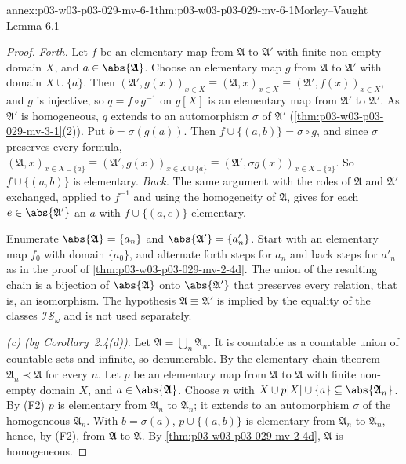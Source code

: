 \begin{annexitem}{annex:p03-w03-p03-029-mv-6-1}{thm:p03-w03-p03-029-mv-6-1}{Morley--Vaught Lemma 6.1}
\begin{proof}
\emph{Forth.} Let \(f\) be an elementary map from \(\mathfrak A\) to
\(\mathfrak A'\) with finite non-empty domain \(X\), and
\(a\in\abs{\mathfrak A}\). Choose an elementary map \(g\) from
\(\mathfrak A\) to \(\mathfrak A'\) with domain \(X\cup\{a\}\). Then
\((\mathfrak A',g(x))_{x\in X}\equiv(\mathfrak A,x)_{x\in X}\equiv(\mathfrak
A',f(x))_{x\in X}\), and \(g\) is injective, so \(q=f\circ g^{-1}\) on
\(g[X]\) is an elementary map from \(\mathfrak A'\) to \(\mathfrak A'\). As
\(\mathfrak A'\) is homogeneous, \(q\) extends to an automorphism \(\sigma\)
of \(\mathfrak A'\) (\cref{thm:p03-w03-p03-029-mv-3-1}(2)). Put
\(b=\sigma(g(a))\). Then \(f\cup\{(a,b)\}=\sigma\circ g\), and since
\(\sigma\) preserves every formula,
\((\mathfrak A,x)_{x\in X\cup\{a\}}\equiv(\mathfrak A',g(x))_{x\in
X\cup\{a\}}\equiv(\mathfrak A',\sigma g(x))_{x\in X\cup\{a\}}\). So
\(f\cup\{(a,b)\}\) is elementary. \emph{Back.} The same argument with the roles
of \(\mathfrak A\) and \(\mathfrak A'\) exchanged, applied to \(f^{-1}\) and
using the homogeneity of \(\mathfrak A\), gives for each \(e\in\abs{\mathfrak
A'}\) an \(a\) with \(f\cup\{(a,e)\}\) elementary.

Enumerate \(\abs{\mathfrak A}=\{a_n\}\) and \(\abs{\mathfrak A'}=\{a'_n\}\).
Start with an elementary map \(f_0\) with domain \(\{a_0\}\), and alternate
forth steps for \(a_n\) and back steps for \(a'_n\) as in the proof of
\cref{thm:p03-w03-p03-029-mv-2-4d}. The union of the resulting chain is a
bijection of \(\abs{\mathfrak A}\) onto \(\abs{\mathfrak A'}\) that
preserves every relation, that is, an isomorphism. The hypothesis
\(\mathfrak A\equiv\mathfrak A'\) is implied by the equality of the classes
\(\mathscr I\mathscr S_\omega\) and is not used separately.

\emph{(c) (by Corollary~2.4(d)).} Let \(\mathfrak A=\bigcup_n\mathfrak A_n\).
It is countable as a countable union of countable sets and infinite, so
denumerable. By the elementary chain theorem \(\mathfrak A_n\prec\mathfrak
A\) for every \(n\). Let \(p\) be an elementary map from \(\mathfrak A\) to
\(\mathfrak A\) with finite non-empty domain \(X\), and
\(a\in\abs{\mathfrak A}\). Choose \(n\) with \(X\cup p[X]\cup\{a\}\subseteq
\abs{\mathfrak A_n}\). By (F2) \(p\) is elementary from \(\mathfrak A_n\) to
\(\mathfrak A_n\); it extends to an automorphism \(\sigma\) of the
homogeneous \(\mathfrak A_n\). With \(b=\sigma(a)\), \(p\cup\{(a,b)\}\) is
elementary from \(\mathfrak A_n\) to \(\mathfrak A_n\), hence, by (F2), from
\(\mathfrak A\) to \(\mathfrak A\). By \cref{thm:p03-w03-p03-029-mv-2-4d},
\(\mathfrak A\) is homogeneous.
\end{proof}
\end{annexitem}

